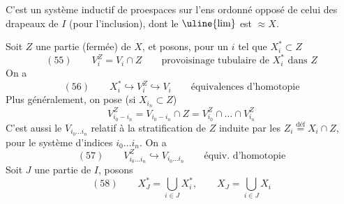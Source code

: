 C'est un système inductif de  proespaces
sur l'ens ordonné opposé de celui des drapeaux de $I$
(pour l'inclusion), dont le $\uline{\lim}$ est  $\approx X$.

Soit $Z$  une partie (fermée)
de $X$, et posons, pour \deleted{$\unsure{\forall}$} un $i$ tel que
$X_i^*\subset Z$
\[
(55)\qquad V_i^Z=V_i\cap Z\qquad
\text{provoisinage tubulaire de }X_i^*\text{ dans }Z
\]
On a
\[
(56)\qquad X_i^*\hookrightarrow V_i^Z\hookrightarrow V_i
\qquad\text{équivalences d'homotopie}
\]
Plus généralement, on pose (si $X_{i_n}\subset Z$)
\[
V_{i_0-i_n}^Z=V_{i_0-i_n}\cap Z
=V_{i_0}^Z\cap\ldots\cap V_{i_n}^Z
\]
C'est aussi le $V_{i_0\ldots i_n}$ relatif à la 
stratification de $Z$ induite par les
$Z_i\overset{\mathrm{déf}}{=}X_i\cap Z$, pour le système d'indices
$i_0\ldots i_n$. On a
\[
(57)\qquad V_{i_0\ldots i_n}^Z\hookrightarrow V_{i_0\ldots i_n}
\qquad\text{équiv. d'homotopie}
\]
Soit $J$ une partie de $I$, posons
\[
(58)\qquad X_J^*=\bigcup_{i\in J}X_i^*,\qquad X_J=\bigcup_{i\in J}X_i
\]
